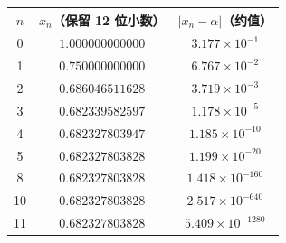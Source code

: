 \begin{tabular}{ccc}
\toprule $n$ & $x_n$（保留 12 位小数） & $|x_n-\alpha|$（约值）\\\midrule
0 & $1.000000000000$ & $3.177\times10^{-1}$ \\
1 & $0.750000000000$ & $6.767\times10^{-2}$ \\
2 & $0.686046511628$ & $3.719\times10^{-3}$ \\
3 & $0.682339582597$ & $1.178\times10^{-5}$ \\
4 & $0.682327803947$ & $1.185\times10^{-10}$ \\
5 & $0.682327803828$ & $1.199\times10^{-20}$ \\
8 & $0.682327803828$ & $1.418\times10^{-160}$ \\
10 & $0.682327803828$ & $2.517\times10^{-640}$ \\
11 & $0.682327803828$ & $5.409\times10^{-1280}$ \\
\bottomrule
\end{tabular}

